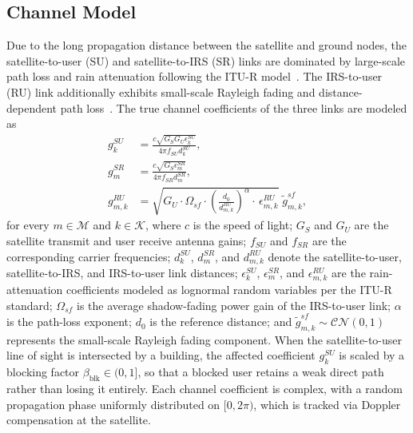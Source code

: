 \documentclass[12pt,onecolumn]{IEEEtran}
\begin{document}
\subsection{Channel Model}

Due to the long propagation distance between the satellite and ground nodes, the satellite-to-user (SU) and satellite-to-IRS (SR) links are dominated by large-scale path loss and rain attenuation following the ITU-R model~\cite{itu618}.
The IRS-to-user (RU) link additionally exhibits small-scale Rayleigh fading and distance-dependent path loss~\cite{3gpp38811}.
The true channel coefficients of the three links are modeled as
\begin{equation}
\begin{aligned}
    g^{SU}_k
    &=
    \frac{c\sqrt{G_S G_U \epsilon^{SU}_k}}{4\pi f_{SU} d^{SU}_k},
    \\[2mm]
    g^{SR}_{m}
    &=
    \frac{c\sqrt{G_S \epsilon^{SR}_{m}}}{4\pi f_{SR} d^{SR}_{m}},
    \\[2mm]
    g^{RU}_{m,k}
    &=
    \sqrt{
        G_U \cdot \Omega_{sf}
        \cdot
        \!\left(\frac{d_0}{d^{RU}_{m,k}}\right)^{\!\alpha}
        \cdot\,
        \epsilon^{RU}_{m,k}
    }
    \;\tilde{g}^{sf}_{m,k},
\end{aligned}
\end{equation}
for every $m \in \mathcal{M}$ and $k \in \mathcal{K}$, where $c$ is the speed of light; $G_S$ and $G_U$ are the satellite transmit and user receive antenna gains; $f_{SU}$ and $f_{SR}$ are the corresponding carrier frequencies; $d^{SU}_k$, $d^{SR}_{m}$, and $d^{RU}_{m,k}$ denote the satellite-to-user, satellite-to-IRS, and IRS-to-user link distances; $\epsilon^{SU}_k$, $\epsilon^{SR}_{m}$, and $\epsilon^{RU}_{m,k}$ are the rain-attenuation coefficients modeled as lognormal random variables per the ITU-R standard; $\Omega_{sf}$ is the average shadow-fading power gain of the IRS-to-user link; $\alpha$ is the path-loss exponent; $d_0$ is the reference distance; and $\tilde{g}^{sf}_{m,k} \sim \mathcal{CN}(0,1)$ represents the small-scale Rayleigh fading component.
When the satellite-to-user line of sight is intersected by a building, the affected coefficient $g^{SU}_k$ is scaled by a blocking factor $\beta_{\mathrm{blk}} \in (0,1]$, so that a blocked user retains a weak direct path rather than losing it entirely.
Each channel coefficient is complex, with a random propagation phase uniformly distributed on $[0, 2\pi)$, which is tracked via Doppler compensation at the satellite.
\end{document}
